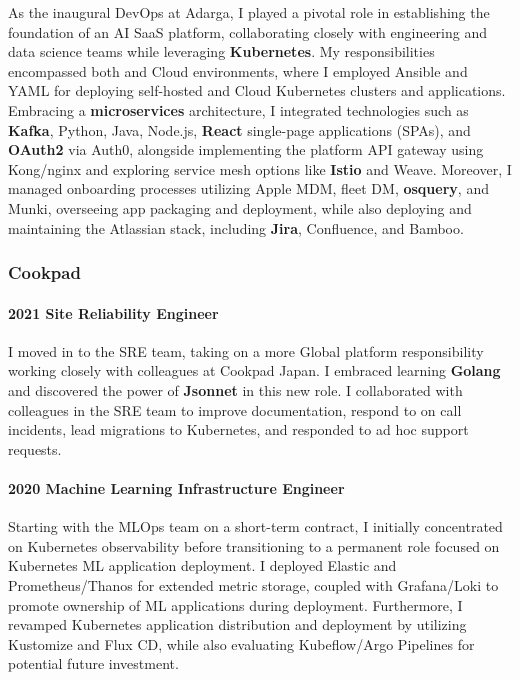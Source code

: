 \documentclass[
]{article}
\begin{document}
As the inaugural DevOps at Adarga, I played a pivotal role in
establishing the foundation of an AI SaaS platform, collaborating
closely with engineering and data science teams while leveraging
\textbf{Kubernetes}. My responsibilities encompassed both \faAws and
\faGoogle Cloud environments, where I employed Ansible and YAML for
deploying self-hosted and Cloud Kubernetes clusters and applications.
Embracing a \textbf{microservices} architecture, I integrated
technologies such as \textbf{Kafka}, Python, Java, Node.js,
\textbf{React} single-page applications (SPAs), and \textbf{OAuth2} via
Auth0, alongside implementing the platform API gateway using Kong/nginx
and exploring service mesh options like \textbf{Istio} and Weave.
Moreover, I managed onboarding processes utilizing Apple MDM, fleet DM,
\textbf{osquery}, and Munki, overseeing app packaging and deployment,
while also deploying and maintaining the Atlassian stack, including
\textbf{Jira}, Confluence, and Bamboo.

\hypertarget{material-office-building-cookpad}{%
\subsubsection{\texorpdfstring{\faBuilding
Cookpad}{ Cookpad}}\label{material-office-building-cookpad}}

\hypertarget{site-reliability-engineer}{%
\paragraph{2021 Site Reliability
Engineer}\label{site-reliability-engineer}}

I moved in to the SRE team, taking on a more Global platform
responsibility working closely with colleagues at Cookpad Japan. I
embraced learning \textbf{Golang} and discovered the power of
\textbf{Jsonnet} in this new role. I collaborated with colleagues in the
SRE team to improve documentation, respond to on call incidents, lead
migrations to Kubernetes, and responded to ad hoc support requests.

\hypertarget{machine-learning-infrastructure-engineer}{%
\paragraph{2020 Machine Learning Infrastructure
Engineer}\label{machine-learning-infrastructure-engineer}}

Starting with the MLOps team on a short-term contract, I initially
concentrated on Kubernetes observability before transitioning to a
permanent role focused on Kubernetes ML application deployment. I
deployed Elastic and Prometheus/Thanos for extended metric storage,
coupled with Grafana/Loki to promote ownership of ML applications during
deployment. Furthermore, I revamped Kubernetes application distribution
and deployment by utilizing Kustomize and Flux CD, while also evaluating
Kubeflow/Argo Pipelines for potential future investment.
\end{document}
